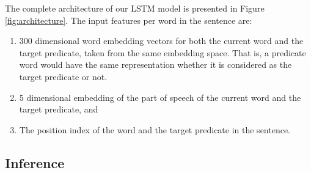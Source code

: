 The complete architecture of our LSTM model is presented in Figure \ref{fig:architecture}. The input features per word in the sentence are:
\begin{enumerate}
\item
300 dimensional word embedding vectors for both the current word and the target predicate, taken from the same embedding space.
That is, a predicate word would have the same
representation whether it is considered as the target predicate or not.

\item 5 dimensional embedding of the part of speech of the current word and the target predicate, and
\item The position index of the word and the target predicate in the sentence.

\end{enumerate}

\subsection{Inference}
\label{subsec-inference}


